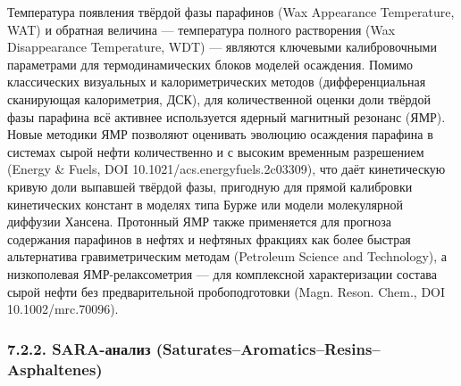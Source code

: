 \documentclass[11pt]{extarticle}
\begin{document}
Температура появления твёрдой фазы парафинов (Wax Appearance Temperature, WAT) и обратная величина --- температура полного растворения (Wax Disappearance Temperature, WDT) --- являются ключевыми калибровочными параметрами для термодинамических блоков моделей осаждения. Помимо классических визуальных и калориметрических методов (дифференциальная сканирующая калориметрия, ДСК), для количественной оценки доли твёрдой фазы парафина всё активнее используется ядерный магнитный резонанс (ЯМР). Новые методики ЯМР позволяют оценивать эволюцию осаждения парафина в системах сырой нефти количественно и с высоким временным разрешением (Energy \& Fuels, DOI 10.1021/acs.energyfuels.2c03309), что даёт кинетическую кривую доли выпавшей твёрдой фазы, пригодную для прямой калибровки кинетических констант в моделях типа Бурже или модели молекулярной диффузии Хансена. Протонный ЯМР также применяется для прогноза содержания парафинов в нефтях и нефтяных фракциях как более быстрая альтернатива гравиметрическим методам (Petroleum Science and Technology), а низкополевая ЯМР-релаксометрия --- для комплексной характеризации состава сырой нефти без предварительной пробоподготовки (Magn. Reson. Chem., DOI 10.1002/mrc.70096).

\subsubsection{7.2.2. SARA-анализ (Saturates--Aromatics--Resins--Asphaltenes)}\label{sara-ux430ux43dux430ux43bux438ux437-saturatesaromaticsresinsasphaltenes}
\end{document}
